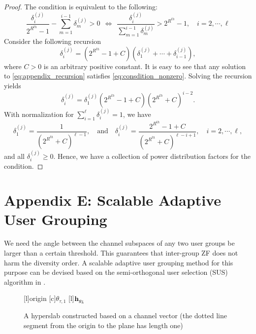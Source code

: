 \documentclass[11pt, draft, onecolumn ]{IEEEtran}
\def\scalefig#1{\epsfxsize #1\textwidth}
\begin{document}
\begin{proof} The condition is equivalent to the following:
\begin{equation}
            \frac{\delta_{i}^{(j)}}{2^{R^{th}}-1} - \sum_{m=1}^{i-1} \delta_{m}^{(j)} > 0 ~~ \Leftrightarrow ~~
           \frac{\delta_{i}^{(j)}}{ \sum_{m=1}^{i-1} \delta_{m}^{(j)}}  > 2^{R^{th}}-1, \quad i = 2,
           \cdots, \ell \label{eq:consdition_nonzero}
\end{equation}
Consider the following recursion
\begin{equation}  \label{eq:appendix_recursion}
\delta_{i}^{(j)}= (2^{R^{th}}-1 + C) (\delta_{1}^{(j)}+\cdots+\delta_{i-1}^{(j)}),
\end{equation}
where $C > 0$ is an arbitrary  positive constant. It is easy to see that any solution to \eqref{eq:appendix_recursion} satisfies \eqref{eq:consdition_nonzero}. Solving the recursion yields
\begin{equation}
\delta_{i}^{(j)}= \delta_{1}^{(j)} (2^{R^{th}}-1 + C) (2^{R^{th}}+ C)^{i-2}.
\end{equation}
With  normalization for $\sum_{i=1}^\ell \delta_{i}^{(j)} = 1$, we have
\begin{equation}  \label{eq:deltaSolution}
            \delta_1^{(j)} = \frac{1}{(2^{R^{th}} + C)^{\ell-1}}, \quad \mbox{and} \quad   \delta_{i}^{(j)} = \frac{2^{R^{th}}-1 + C}{(2^{R^{th}} + C)^{\ell-i+1}}, \quad i = 2,\cdots, \ell,
\end{equation}
and all $\delta_i^{(j)}\ge 0$. Hence, we have a collection of power distribution factors for the condition.
\end{proof}


\section*{Appendix E: Scalable Adaptive User Grouping}

We need the angle between the channel subspaces of any two user groups be larger than a certain threshold. This guarantees that inter-group ZF does not harm the diversity order.
A scalable adaptive user grouping method for this purpose can be devised  based on the semi-orthogonal user selection (SUS) algorithm in \cite{Yoo&Goldsmith}.




\begin{figure}[ht]
\begin{psfrags}
    [l]{\small origin} %
    [c]{\small $\theta_{\tau,1}$} %
    [l]{\small ${\bf h}_{g_{\hat{k}}}$} %
    \centerline{ \scalefig{0.5}  }
    \caption{A hyperslab constructed based on a channel vector (the  dotted line segment from the origin to the plane has length one)}
    \label{fig:sus_hyperslabRev2}
\end{psfrags}
\end{figure}
\end{document}
